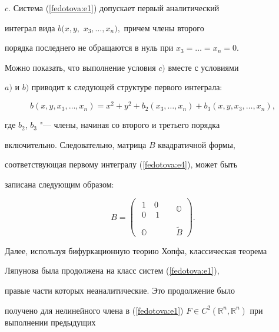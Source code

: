 $c.$ Система (\ref{fedotova:e1}) допускает первый аналитический

интеграл вида $b(x, y,$ $ x_3, \ldots, x_n),$ причем члены второго

порядка последнего не обращаются в нуль при $x_3=\ldots=x_n=0.$



Можно показать, что выполнение условия $c)$ вместе с условиями

$a)$ и $b)$ приводит к следующей структуре первого интеграла:

\begin{equation}

\label{fedotova:e4}

b(x, y, x_3, \ldots, x_n)=x^2+y^2+b_2(x_3,\ldots,x_n)+b_3(x, y, x_3, \ldots, x_n),

\end{equation}

где $b_2$, $b_3$ "--- члены, начиная со второго и третьего порядка

включительно. Следовательно, матрица $B$ квадратичной формы,

соответствующая первому интегралу (\ref{fedotova:e4}), может быть

записана следующим образом:

\begin{equation}

\label{fedotova:e5}

B=\left(\begin{array}{lll}\begin{array}{ll} 1\,\,\,\,\,\,0\\

0\,\,\,\,\,\,\,1\end{array}&&\mathbb{O}\\ \\

\,\,\mathbb{O}&&\tilde{B}

\end{array}\right).

\end{equation}

Далее, используя бифуркационную теорию Хопфа, классическая теорема

Ляпунова была продолжена на класс систем (\ref{fedotova:e1}),

правые части которых неаналитические. Это продолжение было

получено для нелинейного члена в (\ref{fedotova:e1}) $F\in

C^2(\mathbb{R}^n,\mathbb{R}^n)$ при выполнении предыдущих

